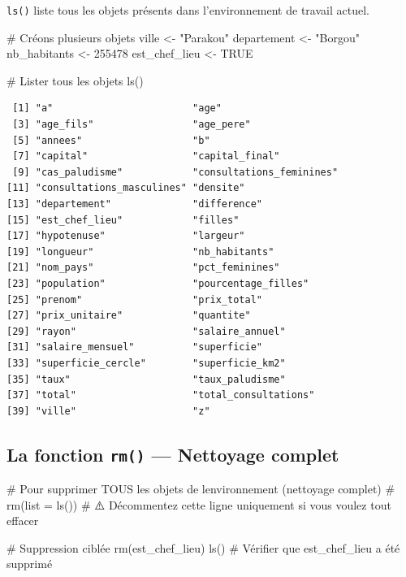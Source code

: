 \documentclass[
  french,
  11pt,
  a4paper,
]{article}
\newenvironment{Shaded}{}{}
\newcommand{\CommentTok}[1]{\textcolor[rgb]{0.42,0.45,0.49}{#1}}
\newcommand{\ConstantTok}[1]{\textcolor[rgb]{0.00,0.36,0.77}{#1}}
\newcommand{\DecValTok}[1]{\textcolor[rgb]{0.00,0.36,0.77}{#1}}
\newcommand{\FunctionTok}[1]{\textcolor[rgb]{0.44,0.26,0.76}{#1}}
\newcommand{\NormalTok}[1]{\textcolor[rgb]{0.14,0.16,0.18}{#1}}
\newcommand{\OtherTok}[1]{\textcolor[rgb]{0.44,0.26,0.76}{#1}}
\newcommand{\StringTok}[1]{\textcolor[rgb]{0.01,0.18,0.38}{#1}}
\begin{document}
\texttt{ls()} liste tous les objets présents dans l'environnement de
travail actuel.

\begin{Shaded}
\begin{Highlighting}[]
\CommentTok{\# Créons plusieurs objets}
\NormalTok{ville }\OtherTok{\textless{}{-}} \StringTok{"Parakou"}
\NormalTok{departement }\OtherTok{\textless{}{-}} \StringTok{"Borgou"}
\NormalTok{nb\_habitants }\OtherTok{\textless{}{-}} \DecValTok{255478}
\NormalTok{est\_chef\_lieu }\OtherTok{\textless{}{-}} \ConstantTok{TRUE}

\CommentTok{\# Lister tous les objets}
\FunctionTok{ls}\NormalTok{()}
\end{Highlighting}
\end{Shaded}

\begin{verbatim}
 [1] "a"                        "age"                     
 [3] "age_fils"                 "age_pere"                
 [5] "annees"                   "b"                       
 [7] "capital"                  "capital_final"           
 [9] "cas_paludisme"            "consultations_feminines" 
[11] "consultations_masculines" "densite"                 
[13] "departement"              "difference"              
[15] "est_chef_lieu"            "filles"                  
[17] "hypotenuse"               "largeur"                 
[19] "longueur"                 "nb_habitants"            
[21] "nom_pays"                 "pct_feminines"           
[23] "population"               "pourcentage_filles"      
[25] "prenom"                   "prix_total"              
[27] "prix_unitaire"            "quantite"                
[29] "rayon"                    "salaire_annuel"          
[31] "salaire_mensuel"          "superficie"              
[33] "superficie_cercle"        "superficie_km2"          
[35] "taux"                     "taux_paludisme"          
[37] "total"                    "total_consultations"     
[39] "ville"                    "z"                       
\end{verbatim}

\subsection{\texorpdfstring{La fonction \texttt{rm()} --- Nettoyage
complet}{La fonction rm() --- Nettoyage complet}}\label{la-fonction-rm-nettoyage-complet}

\begin{Shaded}
\begin{Highlighting}[]
\CommentTok{\# Pour supprimer TOUS les objets de l\textquotesingle{}environnement (nettoyage complet)}
\CommentTok{\# rm(list = ls())  }
\CommentTok{\# ⚠️ Décommentez cette ligne uniquement si vous voulez tout effacer}

\CommentTok{\# Suppression ciblée}
\FunctionTok{rm}\NormalTok{(est\_chef\_lieu)}
\FunctionTok{ls}\NormalTok{()  }\CommentTok{\# Vérifier que est\_chef\_lieu a été supprimé}
\end{Highlighting}
\end{Shaded}
\end{document}
